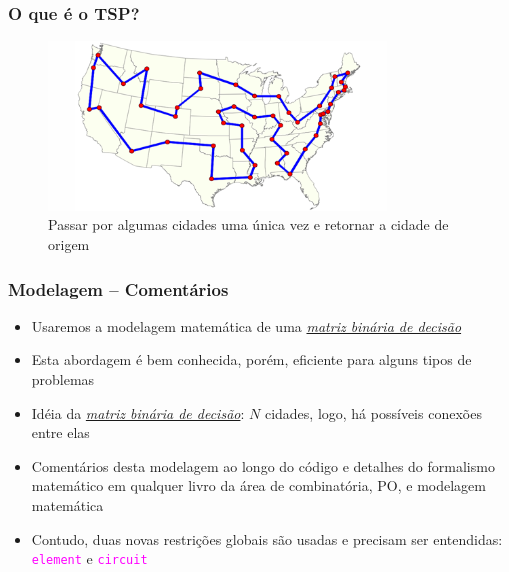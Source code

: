 \begin{frame}[fragile]

\frametitle{O que é o TSP?}

\begin{figure}[!htb]
\begin{center}
\includegraphics[width=0.80\textwidth, height=0.50\textheight]{figures/tsp01.jpg}
\caption{Passar por algumas cidades uma única vez e retornar a cidade de origem}
\end{center}
\end{figure}
    
\end{frame}



\begin{frame}[fragile] 

\frametitle{Modelagem -- Comentários}

\begin{itemize}
  \item Usaremos a modelagem matemática de uma \textit{\underline{matriz binária de decisão}}
  
  \pause
  \item Esta abordagem é bem conhecida, porém, eficiente para alguns tipos de problemas

  \pause
  \item Idéia da \textit{\underline{matriz binária de decisão}}: $N$ cidades, logo, há possíveis
  conexões entre elas 
  
  \pause
  \item Comentários desta modelagem ao longo do código e detalhes do formalismo matemático
  em qualquer livro da área de combinatória, PO, e modelagem matemática

  \pause
  \item Contudo, duas novas restrições globais são usadas e precisam ser entendidas:    \textcolor{magenta}{\texttt{element}} e 
  \textcolor{magenta}{\texttt{circuit}}

\end{itemize}

\end{frame}


